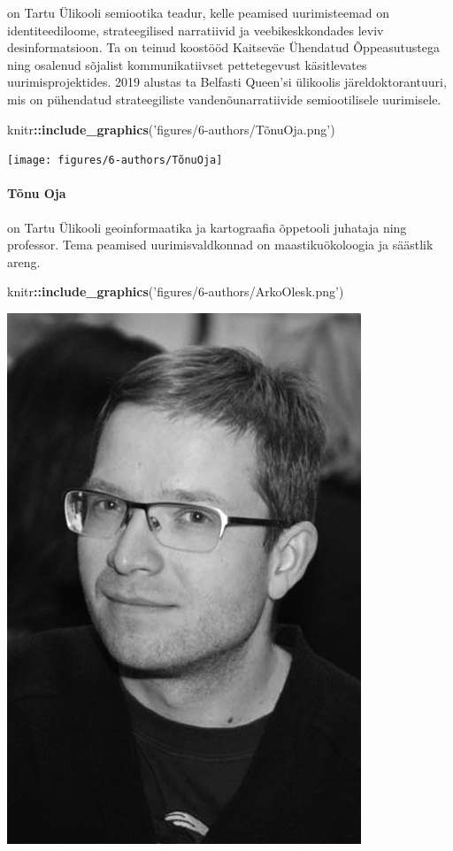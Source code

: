\documentclass[estonian,]{article}
\newenvironment{Shaded}{\begin{snugshade}}{\end{snugshade}}
\newcommand{\KeywordTok}[1]{\textcolor[rgb]{0.13,0.29,0.53}{\textbf{#1}}}
\newcommand{\NormalTok}[1]{#1}
\newcommand{\OperatorTok}[1]{\textcolor[rgb]{0.81,0.36,0.00}{\textbf{#1}}}
\newcommand{\StringTok}[1]{\textcolor[rgb]{0.31,0.60,0.02}{#1}}
\let\oldparagraph\paragraph
\renewcommand{\paragraph}[1]{\oldparagraph{#1}\mbox{}}
\begin{document}
on Tartu Ülikooli semiootika teadur, kelle peamised uurimisteemad on identiteediloome, strateegilised narratiivid ja veebikeskkondades leviv desinformatsioon. Ta on teinud koostööd Kaitseväe Ühendatud Õppeasutustega ning osalenud sõjalist kommunikatiivset pettetegevust käsitlevates uurimisprojektides. 2019 alustas ta Belfasti Queen'si ülikoolis järeldoktorantuuri, mis on pühendatud strateegiliste vandenõunarratiivide semiootilisele uurimisele.

\begin{Shaded}
\begin{Highlighting}[]
\NormalTok{knitr}\OperatorTok{::}\KeywordTok{include_graphics}\NormalTok{(}\StringTok{'figures/6-authors/TõnuOja.png'}\NormalTok{)}
\end{Highlighting}
\end{Shaded}

\begin{flushleft}\texttt{[image: figures/6-authors/TõnuOja]} \end{flushleft}

\hypertarget{tuxf5nu-oja}{%
\paragraph{Tõnu Oja}\label{tuxf5nu-oja}}

on Tartu Ülikooli geoinformaatika ja kartograafia õppetooli juhataja ning professor. Tema peamised uurimisvaldkonnad on maastikuökoloogia ja säästlik areng.

\begin{Shaded}
\begin{Highlighting}[]
\NormalTok{knitr}\OperatorTok{::}\KeywordTok{include_graphics}\NormalTok{(}\StringTok{'figures/6-authors/ArkoOlesk.png'}\NormalTok{)}
\end{Highlighting}
\end{Shaded}

\begin{flushleft}\includegraphics[width=0.5\linewidth]{figures/6-authors/ArkoOlesk} \end{flushleft}
\end{document}
